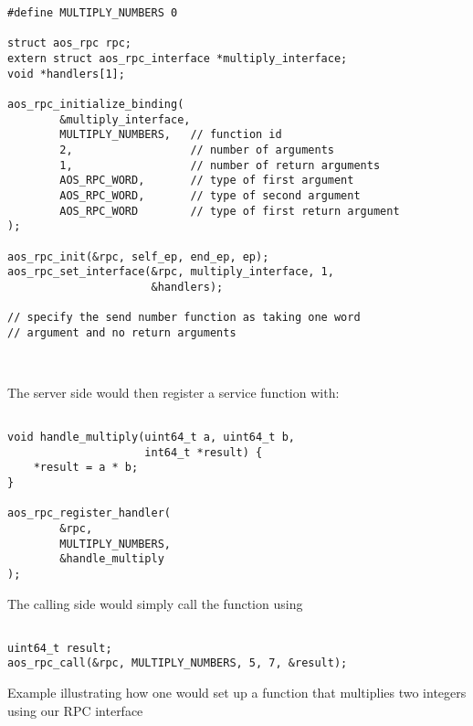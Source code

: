 \begin{code}
\begin{mdframed}[style=myframe]
\begin{verbatim}
#define MULTIPLY_NUMBERS 0

struct aos_rpc rpc;
extern struct aos_rpc_interface *multiply_interface;
void *handlers[1];

aos_rpc_initialize_binding(
        &multiply_interface,
        MULTIPLY_NUMBERS,   // function id
        2,                  // number of arguments
        1,                  // number of return arguments
        AOS_RPC_WORD,       // type of first argument
        AOS_RPC_WORD,       // type of second argument
        AOS_RPC_WORD        // type of first return argument
);

aos_rpc_init(&rpc, self_ep, end_ep, ep);
aos_rpc_set_interface(&rpc, multiply_interface, 1,
                      &handlers);

// specify the send number function as taking one word
// argument and no return arguments



\end{verbatim}
\end{mdframed}

The server side would then register a service function with:

\begin{mdframed}[style=myframe]
\begin{verbatim}

void handle_multiply(uint64_t a, uint64_t b, 
                     int64_t *result) {
    *result = a * b;
}

aos_rpc_register_handler(
        &rpc,
        MULTIPLY_NUMBERS,
        &handle_multiply
);

\end{verbatim}
\end{mdframed}

The calling side would simply call the function using 

\begin{mdframed}[style=myframe]
\begin{verbatim}

uint64_t result;
aos_rpc_call(&rpc, MULTIPLY_NUMBERS, 5, 7, &result);

\end{verbatim}
\end{mdframed}
\label{code:example_rpc}
\caption{Example illustrating how one would set up a function that multiplies two integers using our RPC interface}
\end{code}

